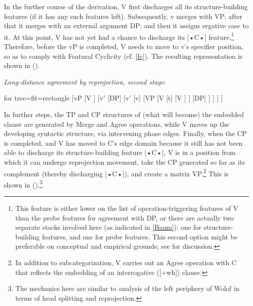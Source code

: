 \documentclass[output=paper
,modfonts
,nonflat]{langsci/langscibook}
\begin{document}
	In the further course of the derivation, V first discharges all its
	structure-building features (if it has any such features
	left). Subsequently, v merges with VP; after that it merges 
	with an external argument DP; and then it assigns ergative case to it. At
	this point, V has not yet had a chance to discharge its [•C•] feature.\footnote{This
		feature is either lower on the list of operation-triggering
		features of V than the probe features for agreement with
		DP, or there are actually two separate stacks involved here
		(as indicated in \ref{Baum}):
		one for structure-building features, and one for probe
		features. This second option might be preferable on conceptual and empirical
		grounds; see \cite{Mueller:04:arg,Mueller:09:eao} for discussion.}
	Therefore, before
	the vP is completed, V needs to move to v's specifier position, so
	as to comply with Featural Cyclicity (cf. \ref{fc}). The resulting
	representation is shown in (\Next).
	
		\begin{exe}
			\ex	\label{ex:mueller:33} \textit{Long-distance agreement by reprojection, second stage}:\\\label{Baum2}
				\begin{forest} 	for tree={fit=rectangle}
					[vP
					[V ]
					[v$'$
					[DP]
					[v$'$
					[v] 
					[VP
					[V
					[t]
					[V  ] ]
					[DP]
					] ] ] ]	
			\end{forest}
		\end{exe}
\noindent In further steps, the TP and CP structures of (what will become) the
	embedded clause are generated by Merge and Agree operations, while V moves up
	the developing syntactic structure, via intervening phase
	edges. Finally, when the CP is completed, and V has moved to C's
	edge domain because it still has not been able to discharge its
	structure-building feature [•C•], V is in a position from which it
	can undergo reprojection movement, take the CP generated so far as
	its complement (thereby discharging [•C•]), and create a matrix
	VP.\footnote{In addition to subcategorization, V carries out an
		Agree operation with C that reflects the embedding of an
		interrogative ([+wh]) clause.} This is
	shown in (\Next).\footnote{The mechanics here are similar to 
		 analysis of the left periphery of Wolof
		in terms of head splitting and reprojection.}\largerpage[-3]   
\end{document}
